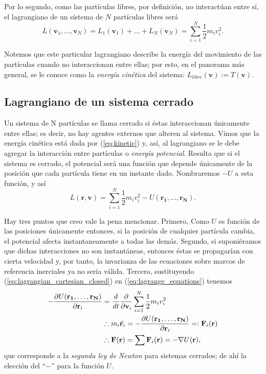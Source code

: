 Por lo segundo, como las partículas libres, por definición, no interactúan entre sí, el lagrangiano de un sistema de $N$ partículas libres será
\begin{equation}
 L(\mathbf{v}_1, \ldots, \mathbf{v}_N) = L_1(\mathbf{v}_1) + \ldots + L_N(\mathbf{v}_N) = \sum_{i=1}^N \frac{1}{2}m_i v_i^2.
 \label{eq:kinetic}
\end{equation}

Notemos que este particular lagrangiano describe la energía del movimiento de las partículas cuando no interaccionan entre ellas; por esto, en el panorama más general, se le conoce como la \textit{energía cinética} del sistema: $L_{libre}(\mathbf{v}) := T(\mathbf{v})$.

\subsection{Lagrangiano de un sistema cerrado} 

Un sistema de N partículas se llama cerrado si éstas interaccionan únicamente entre ellas; es decir, no hay agentes externos que alteren al sistema. Vimos que la energía cinética está dada por (\ref{eq:kinetic}) y, así, al lagrangiano se le debe agregar la interacción entre partículas o \textit{energía potencial}. Resulta que si el sistema es cerrado, el potencial será una función que depende únicamente de la posición que cada partícula tiene en un instante dado. Nombraremos $-U$ a esta función, y así
\begin{equation}
 L(\mathbf{r},\mathbf{v}) = \sum_{i=1}^N \frac{1}{2}m_i v_i^2 -U(\mathbf{r_1},\ldots,\mathbf{r_N}).
 \label{eq:lagrangian_cartesian_closed}
\end{equation} 

Hay tres puntos que creo vale la pena mencionar. Primero, Como $U$ es función de las posiciones únicamente entonces, si la posición de cualquier partícula cambia, el potencial  afecta instantaneamente a todas las demás. Segundo, si suponiéramos que dichas interacciones no son instantáneas, entonces éstas se propagarían con cierta velocidad y, por tanto, la invarianza de las ecuaciones sobre marcos de referencia inerciales ya no sería válida. Tercero, sustituyendo (\ref{eq:lagrangian_cartesian_closed}) en (\ref{eq:lagrange_equations}) tenemos
\begin{align}
 -\frac{\partial U(\mathbf{r_1}, \ldots, \mathbf{r_N})}{\partial \mathbf{r}_i} &= \frac{d}{dt} \frac{\partial }{\partial \mathbf{v}_i} \sum_{i=1}^N \frac{1}{2}m_i v_i^2 \nonumber \\
 &\therefore m_i \ddot{\mathbf{r}_i} = -\frac{\partial U(\mathbf{r_1}, \ldots, \mathbf{r_N})}{\partial \mathbf{r}_i} =: \mathbf{F}_i(\mathbf{r}) \nonumber \\
 &\therefore \mathbf{F}(\mathbf{r}) = \sum \mathbf{F}_i(\mathbf{r}) = - \nabla U(\mathbf{r}),
 \label{eq:newton_second_law}
\end{align}
que corresponde a la \textit{segunda ley de Newton} para sistemas cerrados; de ahí la elección del ``$-$'' para la función $U$.

